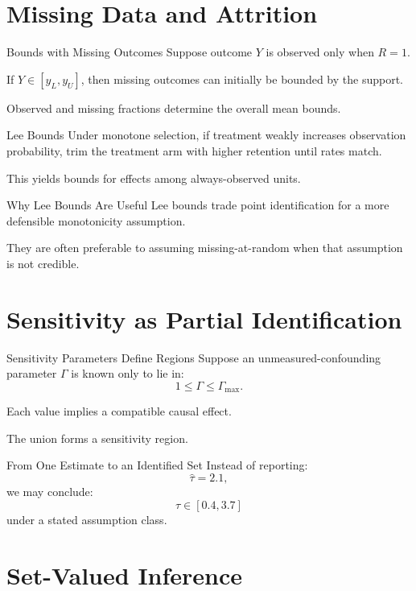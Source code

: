 \documentclass[aspectratio=169,11pt]{beamer}
\begin{document}
\section{Missing Data and Attrition}

\begin{frame}{Bounds with Missing Outcomes}
Suppose outcome \(Y\) is observed only when \(R=1\).

If \(Y\in[y_L,y_U]\), then missing outcomes can initially be bounded by the support.

Observed and missing fractions determine the overall mean bounds.
\end{frame}

\begin{frame}{Lee Bounds}
Under monotone selection, if treatment weakly increases observation probability, trim the treatment arm with higher retention until rates match.

This yields bounds for effects among always-observed units.
\end{frame}

\begin{frame}{Why Lee Bounds Are Useful}
Lee bounds trade point identification for a more defensible monotonicity assumption.

They are often preferable to assuming missing-at-random when that assumption is not credible.
\end{frame}

\section{Sensitivity as Partial Identification}

\begin{frame}{Sensitivity Parameters Define Regions}
Suppose an unmeasured-confounding parameter \(\Gamma\) is known only to lie in:
\[
1\leq \Gamma \leq \Gamma_{\max}.
\]

Each value implies a compatible causal effect.

The union forms a sensitivity region.
\end{frame}

\begin{frame}{From One Estimate to an Identified Set}
Instead of reporting:
\[
\widehat{\tau}=2.1,
\]
we may conclude:
\[
\tau\in[0.4,3.7]
\]
under a stated assumption class.
\end{frame}

\section{Set-Valued Inference}
\end{document}

